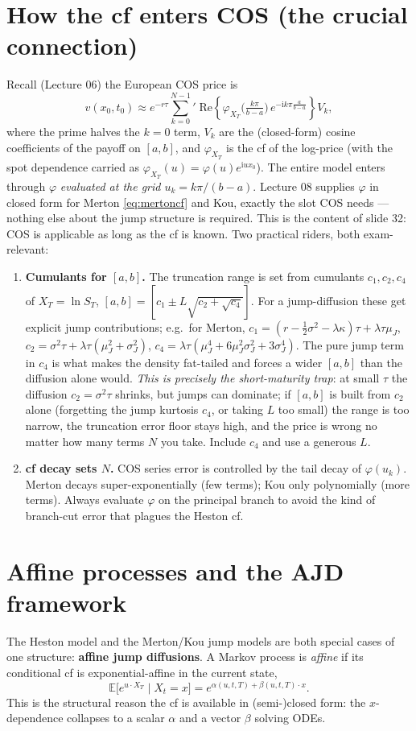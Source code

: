\documentclass[11pt]{article}
\newcommand{\E}{\mathbb{E}}
\newcommand{\ii}{\mathrm{i}}
\newcommand{\ch}{\varphi}
\begin{document}
\section{How the cf enters COS (the crucial connection)}\label{sec:cos}
Recall (Lecture 06) the European COS price is
\[
v(x_0,t_0)\approx e^{-r\tau}\sum_{k=0}^{N-1}{}' \;
\mathrm{Re}\!\left\{\ch_{X_T}\!\Big(\tfrac{k\pi}{b-a}\Big)\,e^{-\ii k\pi\frac{a}{b-a}}\right\}V_k,
\]
where the prime halves the $k=0$ term, $V_k$ are the (closed-form) cosine coefficients of the payoff on
$[a,b]$, and $\ch_{X_T}$ is the cf of the log-price (with the spot dependence carried as
$\ch_{X_T}(u)=\ch(u)e^{\ii u x_0}$). The entire model enters through $\ch$ \emph{evaluated at the grid
$u_k=k\pi/(b-a)$}. Lecture 08 supplies $\ch$ in closed form for Merton \eqref{eq:mertoncf} and Kou,
exactly the slot COS needs --- nothing else about the jump structure is required. This is the content of
slide 32: COS is applicable as long as the cf is known. Two practical riders, both exam-relevant:
\begin{enumerate}[topsep=2pt,itemsep=2pt]
  \item \textbf{Cumulants for $[a,b]$.} The truncation range is set from cumulants $c_1,c_2,c_4$ of
  $X_T=\ln S_T$, $[a,b]=[c_1\pm L\sqrt{c_2+\sqrt{c_4}}]$. For a jump-diffusion these get explicit jump
  contributions; e.g.\ for Merton,
  $c_1=(r-\tfrac12\sigma^2-\lambda\kappa)\tau+\lambda\tau\mu_J$,
  $c_2=\sigma^2\tau+\lambda\tau(\mu_J^2+\sigma_J^2)$,
  $c_4=\lambda\tau(\mu_J^4+6\mu_J^2\sigma_J^2+3\sigma_J^4)$.
  The pure jump term in $c_4$ is what makes the density fat-tailed and forces a wider $[a,b]$ than the
  diffusion alone would. \emph{This is precisely the short-maturity trap}: at small $\tau$ the diffusion
  $c_2=\sigma^2\tau$ shrinks, but jumps can dominate; if $[a,b]$ is built from $c_2$ alone (forgetting the
  jump kurtosis $c_4$, or taking $L$ too small) the range is too narrow, the truncation error floor stays
  high, and the price is wrong no matter how many terms $N$ you take. Include $c_4$ and use a generous $L$.
  \item \textbf{cf decay sets $N$.} COS series error is controlled by the tail decay of $\ch(u_k)$.
  Merton decays super-exponentially (few terms); Kou only polynomially (more terms). Always evaluate
  $\ch$ on the principal branch to avoid the kind of branch-cut error that plagues the Heston cf.
\end{enumerate}

\section{Affine processes and the AJD framework}
The Heston model and the Merton/Kou jump models are both special cases of one structure: \textbf{affine
jump diffusions}. A Markov process is \emph{affine} if its conditional cf is exponential-affine in the
current state,
\[
\E\!\big[e^{u\cdot X_T}\mid X_t=x\big]=e^{\alpha(u,t,T)+\beta(u,t,T)\cdot x}.
\]
This is the structural reason the cf is available in (semi-)closed form: the $x$-dependence collapses to
a scalar $\alpha$ and a vector $\beta$ solving ODEs.
\end{document}
